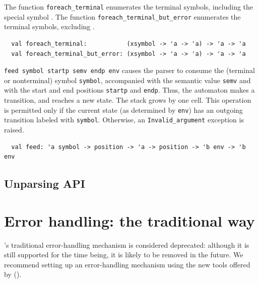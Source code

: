 \documentclass[onecolumn,11pt,nocopyrightspace,preprint]{sigplanconf}
\begin{document}

The function \verb+foreach_terminal+ enumerates the terminal symbols, including the special symbol \error.
The function \verb+foreach_terminal_but_error+ enumerates the terminal symbols, excluding \error.
\begin{verbatim}
  val foreach_terminal:           (xsymbol -> 'a -> 'a) -> 'a -> 'a
  val foreach_terminal_but_error: (xsymbol -> 'a -> 'a) -> 'a -> 'a
\end{verbatim}


\verb+feed symbol startp semv endp env+ causes the parser to consume the
(terminal or nonterminal) symbol \verb+symbol+, accompanied with the semantic
value \verb+semv+ and with the start and end positions \verb+startp+ and
\verb+endp+. Thus, the automaton makes a transition, and reaches a new state.
The stack grows by one cell. This operation is permitted only if the current
state (as determined by \verb+env+) has an outgoing transition labeled with
\verb+symbol+. Otherwise, an \verb+Invalid_argument+ exception is raised.
\begin{verbatim}
  val feed: 'a symbol -> position -> 'a -> position -> 'b env -> 'b env
\end{verbatim}



\subsection{Unparsing API}
\label{sec:unparsing}




\section{Error handling: the traditional way}
\label{sec:errors}

\menhir's traditional error-handling mechanism is considered deprecated:
although it is still supported for the time being, it is likely to be removed
in the future.
%
We recommend setting up an error-handling mechanism using the new tools
offered by \menhir ().
\end{document}
